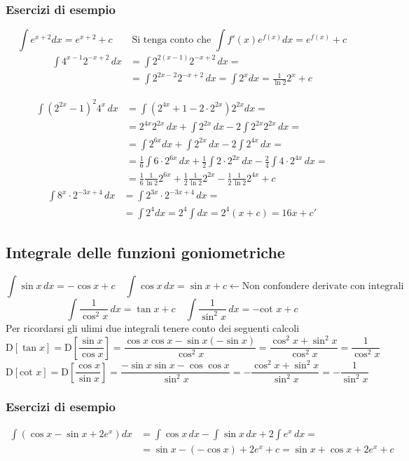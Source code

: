 \documentclass[11pt]{article}
\begin{document}
\subsubsection*{Esercizi di esempio}
\[\int e^{x+2}dx=e^{x+2}+c\,\,\,\,\,\,\,\,\,\,\,\,\text{Si tenga conto che }\int f'(x) e^{f(x)}dx=e^{f(x)}+c\]
\begin{align*}\int 4^{x-1} 2^{-x+2}\,dx&=\int 2^{2(x-1)} 2^{-x+2}\,dx=\\&=\int 2^{2x-2} 2^{-x+2}\,dx=\int 2^x dx=\boxed{\frac{1}{\ln 2} 2^x +c}\end{align*}

\begin{align*}\int\left(2^{2x}-1\right)^2 4^x\,dx &=\int\left(2^{4x}+1-2\cdot2^{2x}\right)2^{2x}dx=\\&=2^{4x}2^{2x}\,dx+\int2^{2x}\,dx-2\int 2^{2x}2^{2x}\,dx=\\&=\int 2^{6x}dx+\int 2^{2x}\,dx-2\int 2^{4x}\,dx=\\&=\frac{1}{6}\int 6 \cdot 2^{6x}\,dx+\frac{1}{2}\int 2\cdot 2^{2x}\,dx-\frac{2}{4}\int 4\cdot 2^{4x}\,dx=\\&=\boxed{\frac{1}{6} \frac{1}{\ln 2} 2^{6x}+\frac{1}{2} \frac{1}{\ln 2} 2^{2x}-\frac{1}{2}\frac{1}{\ln 2}2^{4x}+c}\end{align*}
\begin{align*}\int 8^x \cdot 2^{-3x+4}\,dx&=\int 2^{3x} \cdot 2^{-3x+4}\,dx=\\&=\int 2^4 dx =2^4 \int dx = 2^4(x+c)=\boxed{16x+c'} \end{align*}


\subsection{Integrale delle funzioni goniometriche}
\[\boxed{\int \sin x\, dx = -\cos x + c}\,\,\,\,\,\,\boxed{\int \cos x\, dx = \sin x + c} \longleftarrow \text{Non confondere derivate con integrali}\]
\[\boxed{\int \frac{1}{\cos^2x}\,dx=\tan x +c}\,\,\,\,\,\,\boxed{\int \frac{1}{\sin^2x}\,dx=-\text{cot }x+c}\]
Per ricordarsi gli ulimi due integrali tenere conto dei seguenti calcoli
\[\text{D}[\tan x] = \text{D}\left[\frac{\sin x}{\cos x}\right] = \frac{\cos x \cos x- \sin x (-\sin x )}{\cos^2 x}=\frac{\cos^2x+\sin^2x}{\cos^2x}=\frac{1}{\cos^2x}\]
\[\text{D}[\text{cot } x] = \text{D}\left[\frac{\cos x}{\sin x}\right]=\frac{-\sin x \sin x - \cos \cos x}{\sin^2x}=-\frac{\cos^2x+\sin^2x}{\sin^2x}=-\frac{1}{\sin^2x}\]

\subsubsection*{Esercizi di esempio}
\begin{align*}\int (\cos x - \sin x+ 2 e^x)dx&=\int \cos x\,dx-\int \sin x\,dx+2\int e^x\,dx=\\&=\sin x-(-\cos x)+2e^x+c=\boxed{\sin x+\cos x+2e^x+c}\end{align*}
\end{document}
